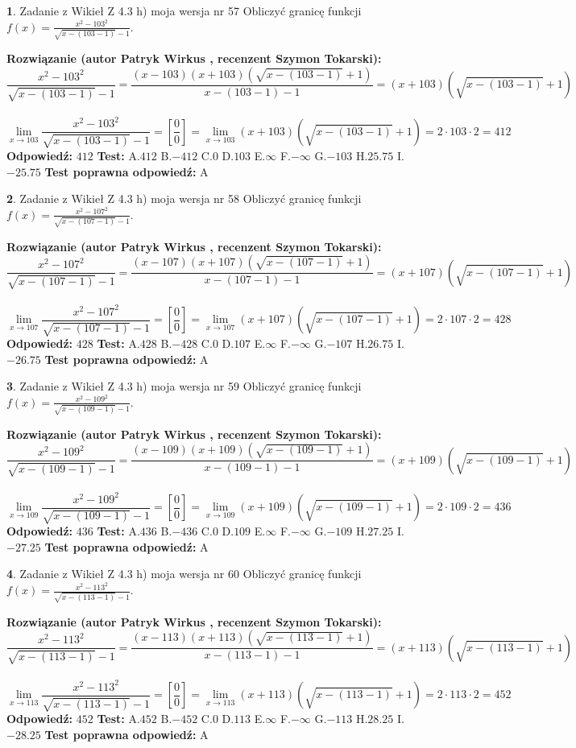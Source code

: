 \documentclass[12pt, a4paper]{article}
\theoremstyle{definition} %
\newtheorem{zad}{}
\newcommand{\zadStart}[1]{\begin{zad}#1\newline}
\newcommand{\zadStop}{\end{zad}}
\newcommand{\rozwStart}[2]{\noindent \textbf{Rozwiązanie (autor #1 , recenzent #2): }\newline}
\newcommand{\rozwStop}{\newline}
\newcommand{\odpStart}{\noindent \textbf{Odpowiedź:}\newline}
\newcommand{\odpStop}{\newline}
\newcommand{\testStart}{\noindent \textbf{Test:}\newline}
\newcommand{\testStop}{\newline}
\newcommand{\kluczStart}{\noindent \textbf{Test poprawna odpowiedź:}\newline}
\newcommand{\kluczStop}{\newline}
\begin{document}
\zadStart{Zadanie z Wikieł Z 4.3 h) moja wersja nr 57}
Obliczyć granicę funkcji $f(x)=\frac{x^{2} - 103^{2}}{\sqrt{x-(103-1)}-1}$.
\zadStop
\rozwStart{Patryk Wirkus}{Szymon Tokarski}
$$\frac{x^{2} - 103^{2}}{\sqrt{x-(103-1)}-1}=\frac{(x-103)(x+103)(\sqrt{x-(103-1)}+1)}{x-(103-1)-1}=(x+103)(\sqrt{x-(103-1)}+1)$$
\\
$$\lim\limits_{x\to 103}\frac{x^{2} - 103^{2}}{\sqrt{x-(103-1)}-1}=[\frac{0}{0}]=
\lim\limits_{x\to 103}(x+103)(\sqrt{x-(103-1)}+1) = 2\cdot103 \cdot 2 = 412$$
\rozwStop
\odpStart
$412$
\odpStop
\testStart
A.$412$
B.$-412$
C.$0$
D.$103$
E.$\infty$
F.$-\infty$
G.$-103$
H.$25.75$
I.$-25.75$
\testStop
\kluczStart
A
\kluczStop



\zadStart{Zadanie z Wikieł Z 4.3 h) moja wersja nr 58}
Obliczyć granicę funkcji $f(x)=\frac{x^{2} - 107^{2}}{\sqrt{x-(107-1)}-1}$.
\zadStop
\rozwStart{Patryk Wirkus}{Szymon Tokarski}
$$\frac{x^{2} - 107^{2}}{\sqrt{x-(107-1)}-1}=\frac{(x-107)(x+107)(\sqrt{x-(107-1)}+1)}{x-(107-1)-1}=(x+107)(\sqrt{x-(107-1)}+1)$$
\\
$$\lim\limits_{x\to 107}\frac{x^{2} - 107^{2}}{\sqrt{x-(107-1)}-1}=[\frac{0}{0}]=
\lim\limits_{x\to 107}(x+107)(\sqrt{x-(107-1)}+1) = 2\cdot107 \cdot 2 = 428$$
\rozwStop
\odpStart
$428$
\odpStop
\testStart
A.$428$
B.$-428$
C.$0$
D.$107$
E.$\infty$
F.$-\infty$
G.$-107$
H.$26.75$
I.$-26.75$
\testStop
\kluczStart
A
\kluczStop



\zadStart{Zadanie z Wikieł Z 4.3 h) moja wersja nr 59}
Obliczyć granicę funkcji $f(x)=\frac{x^{2} - 109^{2}}{\sqrt{x-(109-1)}-1}$.
\zadStop
\rozwStart{Patryk Wirkus}{Szymon Tokarski}
$$\frac{x^{2} - 109^{2}}{\sqrt{x-(109-1)}-1}=\frac{(x-109)(x+109)(\sqrt{x-(109-1)}+1)}{x-(109-1)-1}=(x+109)(\sqrt{x-(109-1)}+1)$$
\\
$$\lim\limits_{x\to 109}\frac{x^{2} - 109^{2}}{\sqrt{x-(109-1)}-1}=[\frac{0}{0}]=
\lim\limits_{x\to 109}(x+109)(\sqrt{x-(109-1)}+1) = 2\cdot109 \cdot 2 = 436$$
\rozwStop
\odpStart
$436$
\odpStop
\testStart
A.$436$
B.$-436$
C.$0$
D.$109$
E.$\infty$
F.$-\infty$
G.$-109$
H.$27.25$
I.$-27.25$
\testStop
\kluczStart
A
\kluczStop



\zadStart{Zadanie z Wikieł Z 4.3 h) moja wersja nr 60}
Obliczyć granicę funkcji $f(x)=\frac{x^{2} - 113^{2}}{\sqrt{x-(113-1)}-1}$.
\zadStop
\rozwStart{Patryk Wirkus}{Szymon Tokarski}
$$\frac{x^{2} - 113^{2}}{\sqrt{x-(113-1)}-1}=\frac{(x-113)(x+113)(\sqrt{x-(113-1)}+1)}{x-(113-1)-1}=(x+113)(\sqrt{x-(113-1)}+1)$$
\\
$$\lim\limits_{x\to 113}\frac{x^{2} - 113^{2}}{\sqrt{x-(113-1)}-1}=[\frac{0}{0}]=
\lim\limits_{x\to 113}(x+113)(\sqrt{x-(113-1)}+1) = 2\cdot113 \cdot 2 = 452$$
\rozwStop
\odpStart
$452$
\odpStop
\testStart
A.$452$
B.$-452$
C.$0$
D.$113$
E.$\infty$
F.$-\infty$
G.$-113$
H.$28.25$
I.$-28.25$
\testStop
\kluczStart
A
\kluczStop
\end{document}
